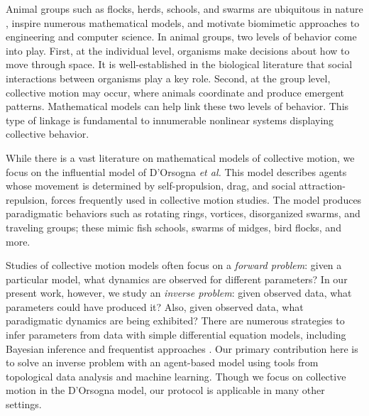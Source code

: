 \documentclass[%
 aip,
reprint,
 amsmath,amssymb,
 aps,
showkeys
]{revtex4-1}
\begin{document}
Animal groups such as flocks, herds, schools, and swarms are ubiquitous in nature \cite{CamDenFra2001,Sum2010}, inspire numerous mathematical models\cite{giardina2008,vicsek2012,degond2018,degond2018age}, and motivate biomimetic approaches to engineering and computer science.\cite{VinBogBog2006,Bhu2009} In animal groups, two levels of behavior come into play. First, at the individual level, organisms make decisions about how to move through space. It is well-established in the biological literature that social interactions between organisms play a key role. Second, at the group level, collective motion may occur, where animals coordinate and produce emergent patterns. Mathematical models can help link these two levels of behavior. This type of linkage is fundamental to innumerable nonlinear systems displaying collective behavior.


While there is a vast literature on mathematical models of collective motion, we focus on the influential model of D'Orsogna \emph{et al.}\cite{DorChuBer2006} This model describes agents whose movement is determined by self-propulsion, drag, and social attraction-repulsion, forces frequently used in collective motion studies. \cite{LevRapCoh2001,CouKraJam2002} The model produces paradigmatic behaviors such as rotating rings, vortices, disorganized swarms, and  traveling groups; these mimic fish schools, swarms of midges, bird flocks, and more. \cite{ParEde1999,Hep1997,NiOue2015}

Studies of collective motion models often focus on a \emph{forward problem}: given a particular model, what dynamics are observed for different parameters? In our present work, however, we study an \emph{inverse problem}: given observed data, what parameters could have produced it? Also, given observed data, what paradigmatic dynamics are being exhibited?\cite{lukeman2010, manhart2018} There are numerous strategies to infer parameters from data with simple differential equation models, including Bayesian inference \cite{stuart_inverse_2010} and frequentist approaches \cite{banks_parameter_1983}. Our primary contribution here is to solve an inverse problem with an agent-based model using tools from topological data analysis and machine learning. Though we focus on collective motion in the D'Orsogna model, our protocol is applicable in many other settings.
\end{document}
